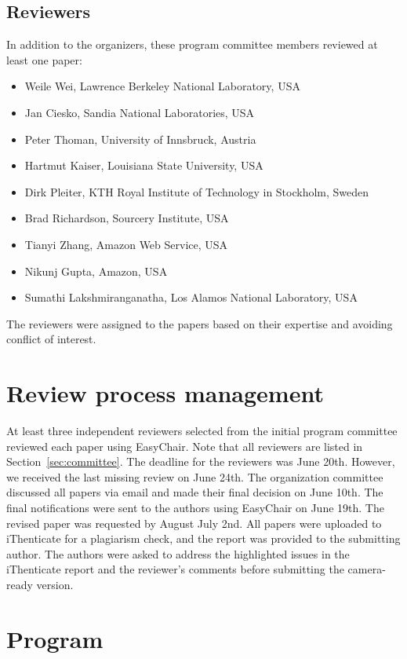\documentclass{article}
\begin{document}
\subsection{Reviewers}
In addition to the organizers, these program committee members reviewed at least one paper:
\begin{itemize}
  \item Weile Wei, Lawrence Berkeley National Laboratory, USA
   \item Jan Ciesko, Sandia National Laboratories, USA
    \item Peter Thoman, University of Innsbruck, Austria
     \item Hartmut Kaiser, Louisiana State University, USA
    \item Dirk Pleiter, KTH Royal Institute of Technology in Stockholm, Sweden
    \item Brad Richardson, Sourcery Institute, USA
 \item Tianyi Zhang, Amazon Web Service, USA
 \item Nikunj Gupta, Amazon, USA
  \item Sumathi Lakshmiranganatha, Los Alamos National Laboratory, USA
\end{itemize}
The reviewers were assigned to the papers based on their expertise and avoiding conflict of interest. 


\section{Review process management}
At least three independent reviewers selected from the initial program committee reviewed each paper using EasyChair. Note that all reviewers are listed in Section~\ref{sec:committee}. The deadline for the reviewers was June 20th. However, we received the last missing review on June 24th. The organization committee discussed all papers via email and made their final decision on June 10th. The final notifications were sent to the authors using EasyChair on June 19th. The revised paper was requested by August July 2nd. All papers were uploaded to iThenticate for a plagiarism check, and the report was provided to the submitting author. The authors were asked to address the highlighted issues in the iThenticate report and the reviewer’s comments before submitting the camera-ready version. 


\section{Program}
\end{document}
